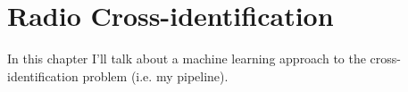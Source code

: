 \chapter{Radio Cross-identification}

In this chapter I'll talk about a machine learning approach to the cross-identification problem (i.e. my pipeline).

